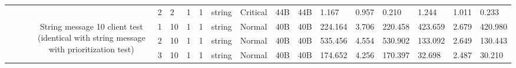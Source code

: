 \begin{landscape}
\begin{table}[]
{\begin{tabular}{@{}ccccllllllllllllll@{}}
                                                                                   &                              &                                &                                                                                                          & 2                                                     & 2                                        & 1                                          & 1                                 & string                           & Critical                           & 44B                                           & 44B                                             & 1.167                   & 0.957    & 0.210                        & 1.244                   & 1.011    & 0.233                        \\
                                                                                   &                              &                                & \multirow{10}{*}{String message 10 client test (identical with string message with prioritization test)} & 1                                                     & 10                                       & 1                                          & 1                                 & string                           & Normal                             & 40B                                           & 40B                                             & 224.164                 & 3.706    & 220.458                      & 423.659                 & 2.679    & 420.980                      \\
                                                                                   &                              &                                &                                                                                                          & 2                                                     & 10                                       & 1                                          & 1                                 & string                           & Normal                             & 40B                                           & 40B                                             & 535.456                 & 4.554    & 530.902                      & 133.092                 & 2.649    & 130.443                      \\
                                                                                   &                              &                                &                                                                                                          & 3                                                     & 10                                       & 1                                          & 1                                 & string                           & Normal                             & 40B                                           & 40B                                             & 174.652                 & 4.256    & 170.397                      & 32.698                  & 2.487    & 30.210                       \\

\end{tabular}}
\end{table}
\end{landscape}
